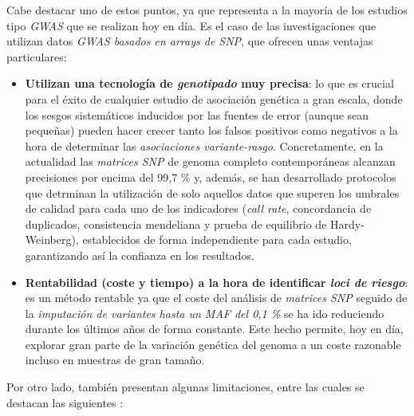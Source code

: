 \documentclass[IB,BIB]{TFUOC}%
\begin{document}
\normalsize

Cabe destacar uno de estos puntos, ya que representa a la mayoría de los estudios tipo \textit{GWAS} que se realizan hoy en día. Es el caso de las investigaciones que utilizan datos \textit{GWAS basados en arrays de SNP}, que ofrecen unas ventajas particulares:

\footnotesize

\begin{itemize}
    \item \textbf{Utilizan una tecnología de \textit{genotipado} muy precisa}: lo que es crucial para el éxito de cualquier estudio de asociación genética a gran escala, donde los sesgos sistemáticos inducidos por las fuentes de error (aunque sean pequeñas) pueden hacer crecer tanto los falsos positivos como negativos a la hora de determinar las \textit{asociaciones variante-rasgo}. Concretamente, en la actualidad las \textit{matrices SNP} de genoma completo contemporáneas alcanzan precisiones por encima del 99,7 \% y, además, se han desarrollado protocolos que detrminan la utilización de solo aquellos datos que superen los umbrales de calidad para cada uno de los indicadores (\textit{call rate}, concordancia de duplicados, consistencia mendeliana y prueba de equilibrio de Hardy-Weinberg), establecidos de forma independiente para cada estudio, garantizando así la confianza en los resultados.
    \item \textbf{Rentabilidad (coste y tiempo) a la hora de identificar \textit{loci de riesgo}}: es un método rentable ya que el coste del análisis de \textit{matrices SNP} seguido de la \textit{imputación de variantes hasta un MAF del 0,1 \%} se ha ido reduciendo durante los últimos años de forma constante. Este hecho permite, hoy en día, explorar gran parte de la variación genética del genoma a un coste razonable incluso en muestras de gran tamaño.
\end{itemize}

\normalsize

Por otro lado, también presentan algunas limitaciones, entre las cuales se destacan las siguientes \cite{tam_benefits_2019, turner_quality_2011, noauthor_genome-wide_2023}:

\footnotesize
\end{document}
